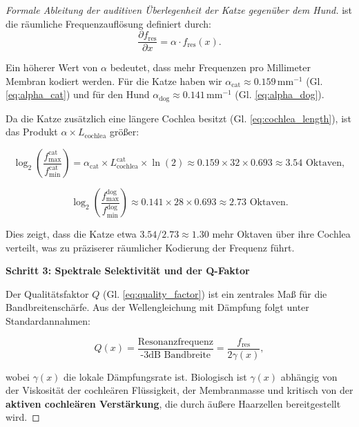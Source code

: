 ﻿\documentclass[12pt, a4paper]{article}
\theoremstyle{definition}
\theoremstyle{remark}
\begin{document}
\begin{proof}[Formale Ableitung der auditiven Überlegenheit der Katze gegenüber dem Hund]
ist die räumliche Frequenzauflösung definiert durch:
\begin{equation}
\frac{\partial f_{\text{res}}}{\partial x} = \alpha \cdot f_{\text{res}}(x).
\label{eq:spatial_frequency_resolution}
\end{equation}

Ein höherer Wert von $\alpha$ bedeutet, dass mehr Frequenzen pro Millimeter Membran kodiert werden. Für die Katze haben wir $\alpha_{\mathrm{cat}} \approx 0.159\,\mathrm{mm}^{-1}$ (Gl. \ref{eq:alpha_cat}) und für den Hund $\alpha_{\mathrm{dog}} \approx 0.141\,\mathrm{mm}^{-1}$ (Gl. \ref{eq:alpha_dog}).

Da die Katze zusätzlich eine längere Cochlea besitzt (Gl. \ref{eq:cochlea_length}), ist das Produkt $\alpha \times L_{\text{cochlea}}$ größer:

\begin{equation}
\log_2\left(\frac{f_{\max}^{\mathrm{cat}}}{f_{\min}^{\mathrm{cat}}}\right) = \alpha_{\mathrm{cat}} \times L_{\text{cochlea}}^{\mathrm{cat}} \times \ln(2) \approx 0.159 \times 32 \times 0.693 \approx 3.54 \text{ Oktaven},
\label{eq:octaves_cat}
\end{equation}

\begin{equation}
\log_2\left(\frac{f_{\max}^{\mathrm{dog}}}{f_{\min}^{\mathrm{dog}}}\right) \approx 0.141 \times 28 \times 0.693 \approx 2.73 \text{ Oktaven}.
\label{eq:octaves_dog}
\end{equation}

Dies zeigt, dass die Katze etwa $3.54 / 2.73 \approx 1.30$ mehr Oktaven über ihre Cochlea verteilt, was zu präziserer räumlicher Kodierung der Frequenz führt.

\textbf{Schritt 3: Spektrale Selektivität und der Q-Faktor}

Der Qualitätsfaktor $Q$ (Gl. \ref{eq:quality_factor}) ist ein zentrales Maß für die Bandbreitenschärfe. Aus der Wellengleichung mit Dämpfung folgt unter Standardannahmen:

\begin{equation}
Q(x) = \frac{\text{Resonanzfrequenz}}{\text{-3dB Bandbreite}} = \frac{f_{\text{res}}}{2\gamma(x)},
\label{eq:q_definition_formal}
\end{equation}

wobei $\gamma(x)$ die lokale Dämpfungsrate ist. Biologisch ist $\gamma(x)$ abhängig von der Viskosität der cochleären Flüssigkeit, der Membranmasse und kritisch von der \textbf{aktiven cochleären Verstärkung}, die durch äußere Haarzellen bereitgestellt wird.


\end{proof}
\end{document}
